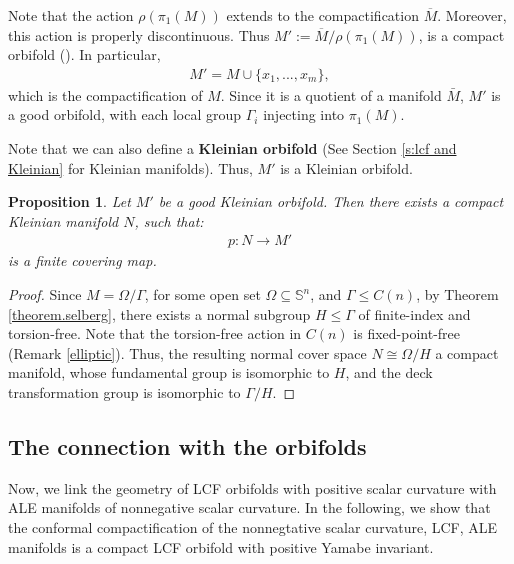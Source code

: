 \documentclass[12pt]{amsart}
\newtheorem{proposition}[theorem]{Proposition}
\theoremstyle{definition}
\begin{document}
Note that the action $\rho(\pi_1(M))$ extends to the compactification $\overline{M}$. Moreover, this action is properly discontinuous. Thus $M':=\overline{M}/\rho(\pi_1(M))$, is a compact orbifold (\cite{Thurston_orbifold}).
In particular, 
\begin{align*}
    M'=M\cup\{x_1,...,x_m\},
\end{align*}
which is the compactification of $M$. Since it is a quotient of a manifold $\bar{M}$, $M'$ is a good orbifold, with each local group $\Gamma_i$ injecting into $\pi_1(M)$. 

Note that we can also define a \textbf{Kleinian orbifold} (See Section \ref{s:lcf and Kleinian} for Kleinian manifolds).
Thus, $M'$ is a Kleinian orbifold.


\begin{proposition}\label{manifold cover}
    Let $M'$ be a good Kleinian orbifold. Then there exists a compact Kleinian manifold $N$, such that:
    \begin{align*}
        p: N\to M'
    \end{align*}
    is a finite covering map.
\end{proposition}
\begin{proof}
    Since $M = \Omega/\Gamma$, for some open set $\Omega\subseteq \mathbb{S}^n$, and $\Gamma\leq C(n)$, by Theorem \ref{theorem.selberg}, there exists a normal subgroup $H\leq \Gamma$ of finite-index and torsion-free. Note that the torsion-free action in $C(n)$ is fixed-point-free (Remark \ref{elliptic}). Thus, the resulting normal cover space $N\cong \Omega/H$ a compact manifold, whose fundamental group is isomorphic to $H$, and the deck transformation group is isomorphic to $\Gamma/H$.
\end{proof}

\subsection{The connection with the orbifolds}\label{good orbifolds proof}

Now, we link the geometry of LCF orbifolds with positive scalar curvature with  ALE manifolds of nonnegative scalar curvature. In the following, we show that the conformal compactification of the nonnegtative scalar curvature, LCF, ALE manifolds is a compact LCF orbifold with positive Yamabe invariant. 
\end{document}
